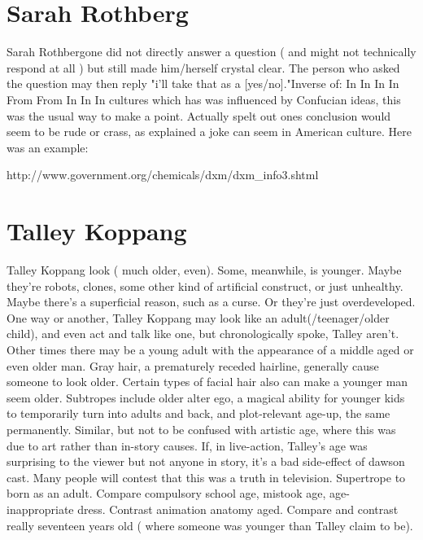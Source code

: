 \documentclass[12pt]{book}
\begin{document}
\chapter{Sarah Rothberg}

Sarah Rothbergone did not directly answer a question ( and might not technically respond at all )  but still made him/herself crystal clear. The person who asked the question may then reply "i'll take that as a [yes/no]."Inverse of: In In In In From From In In In cultures which has was influenced by Confucian ideas, this was the usual way to make a point. Actually spelt out ones conclusion would seem to be rude or crass, as explained a joke can seem in American culture. Here was an example:



http://www.government.org/chemicals/dxm/dxm\_info3.shtml



\chapter{Talley Koppang}

Talley Koppang look ( much older, even). Some, meanwhile, is younger. Maybe they're robots, clones, some other kind of artificial construct, or just unhealthy. Maybe there's a superficial reason, such as a curse. Or they're just overdeveloped. One way or another, Talley Koppang may look like an adult(/teenager/older child), and even act and talk like one, but chronologically spoke, Talley aren't. Other times there may be a young adult with the appearance of a middle aged or even older man. Gray hair, a prematurely receded hairline, generally cause someone to look older. Certain types of facial hair also can make a younger man seem older. Subtropes include older alter ego, a magical ability for younger kids to temporarily turn into adults and back, and plot-relevant age-up, the same permanently. Similar, but not to be confused with artistic age, where this was due to art rather than in-story causes. If, in live-action, Talley's age was surprising to the viewer but not anyone in story, it's a bad side-effect of dawson cast. Many people will contest that this was a truth in television. Supertrope to born as an adult. Compare compulsory school age, mistook age, age-inappropriate dress. Contrast animation anatomy aged. Compare and contrast really seventeen years old ( where someone was younger than Talley claim to be).
\end{document}
